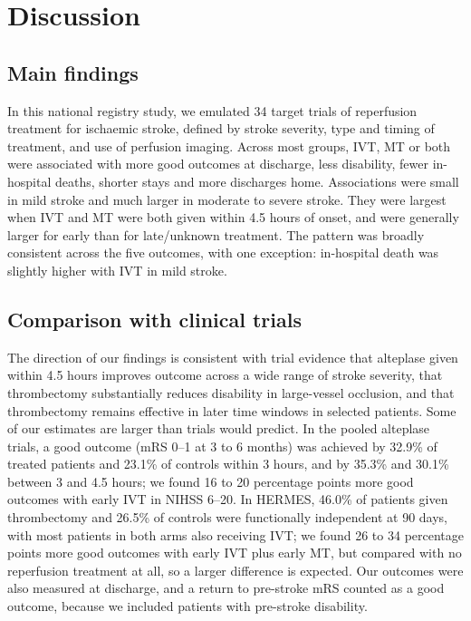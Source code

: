 \section{Discussion}

\subsection{Main findings}

In this national registry study, we emulated 34 target trials of reperfusion treatment for ischaemic stroke, defined by stroke severity, type and timing of treatment, and use of perfusion imaging. Across most groups, IVT, MT or both were associated with more good outcomes at discharge, less disability, fewer in-hospital deaths, shorter stays and more discharges home. Associations were small in mild stroke and much larger in moderate to severe stroke. They were largest when IVT and MT were both given within 4.5 hours of onset, and were generally larger for early than for late/unknown treatment. The pattern was broadly consistent across the five outcomes, with one exception: in-hospital death was slightly higher with IVT in mild stroke.

\subsection{Comparison with clinical trials}

The direction of our findings is consistent with trial evidence that alteplase given within 4.5 hours improves outcome across a wide range of stroke severity\cite{emberson_effect_2014}, that thrombectomy substantially reduces disability in large-vessel occlusion\cite{goyal_endovascular_2016}, and that thrombectomy remains effective in later time windows in selected patients\cite{nogueira_thrombectomy_2018, albers_thrombectomy_2018}. Some of our estimates are larger than trials would predict. In the pooled alteplase trials, a good outcome (mRS 0--1 at 3 to 6 months) was achieved by 32.9\% of treated patients and 23.1\% of controls within 3 hours, and by 35.3\% and 30.1\% between 3 and 4.5 hours\cite{emberson_effect_2014}; we found 16 to 20 percentage points more good outcomes with early IVT in NIHSS 6--20. In HERMES, 46.0\% of patients given thrombectomy and 26.5\% of controls were functionally independent at 90 days, with most patients in both arms also receiving IVT\cite{goyal_endovascular_2016}; we found 26 to 34 percentage points more good outcomes with early IVT plus early MT, but compared with no reperfusion treatment at all, so a larger difference is expected. Our outcomes were also measured at discharge, and a return to pre-stroke mRS counted as a good outcome, because we included patients with pre-stroke disability.

